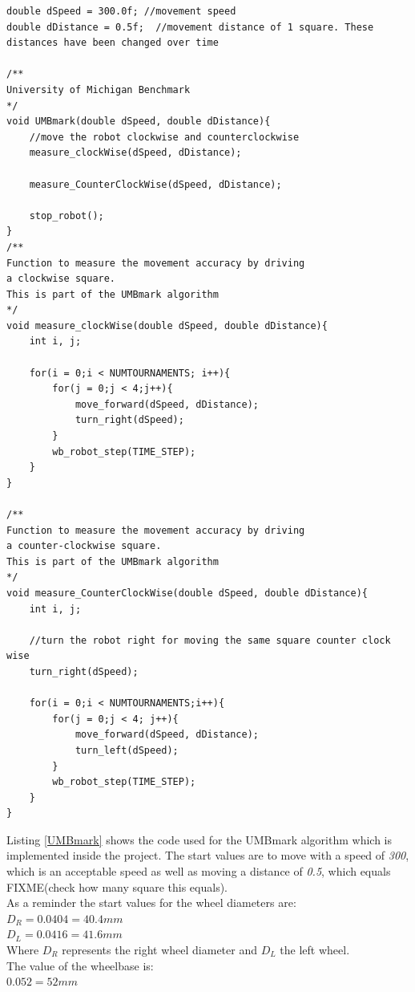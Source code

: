 \begin{lstlisting}[caption={The UMBmark experiment procedure}, label={UMBmark}]
double dSpeed = 300.0f; //movement speed
double dDistance = 0.5f;  //movement distance of 1 square. These distances have been changed over time

/**
University of Michigan Benchmark
*/
void UMBmark(double dSpeed, double dDistance){    
    //move the robot clockwise and counterclockwise
    measure_clockWise(dSpeed, dDistance);
    
    measure_CounterClockWise(dSpeed, dDistance);
    
    stop_robot();
}
/**
Function to measure the movement accuracy by driving
a clockwise square.
This is part of the UMBmark algorithm
*/
void measure_clockWise(double dSpeed, double dDistance){
    int i, j;
    
    for(i = 0;i < NUMTOURNAMENTS; i++){
        for(j = 0;j < 4;j++){
            move_forward(dSpeed, dDistance);
            turn_right(dSpeed);
        }
        wb_robot_step(TIME_STEP);
    }
} 

/**
Function to measure the movement accuracy by driving
a counter-clockwise square.
This is part of the UMBmark algorithm
*/
void measure_CounterClockWise(double dSpeed, double dDistance){
    int i, j;
    
    //turn the robot right for moving the same square counter clock wise
    turn_right(dSpeed);
    
    for(i = 0;i < NUMTOURNAMENTS;i++){        
        for(j = 0;j < 4; j++){
            move_forward(dSpeed, dDistance);
            turn_left(dSpeed);
        }
        wb_robot_step(TIME_STEP);
    }
}
\end{lstlisting}

Listing \ref{UMBmark} shows the code used for the UMBmark algorithm which is implemented inside the project. The start values are to move with a speed of \textit{300}, which is an acceptable speed as well as moving a distance of \textit{0.5}, which equals FIXME(check how many square this equals).\\
As a reminder the start values for the wheel diameters are:\\
$D_{R} = 0.0404 = 40.4mm$\\
$D_{L} = 0.0416 = 41.6mm$\\
Where $D_{R}$ represents the right wheel diameter and  $D_{L}$ the left wheel.\\
The value of the wheelbase is:\\
$0.052 = 52mm$\\


